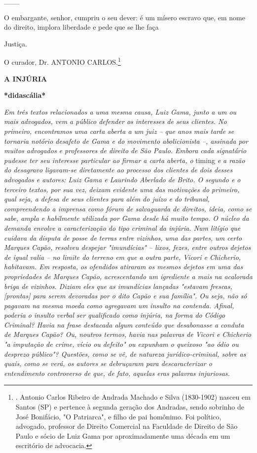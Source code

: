\_\_\_

O embargante, senhor, cumpriu o seu dever: é um mísero escravo que, em
nome do direito, implora liberdade e pede que se lhe faça

Justiça.

O curador, Dr. ANTONIO CARLOS.\footnote{. Antonio Carlos Ribeiro de
  Andrada Machado e Silva (1830-1902) nasceu em Santos (SP) e pertence à
  segunda geração dos Andradas, sendo sobrinho de José Bonifácio, "O
  Patriarca", e filho de pai homônimo. Foi político, advogado, professor
  de Direito Comercial na Faculdade de Direito de São Paulo e sócio de
  Luiz Gama por aproximadamente uma década em um escritório de
  advocacia.}

\protect\hypertarget{Secao_Sem_Titulo-6}{}{}\textbf{A INJÚRIA}

\textbf{*didascália*}

\emph{Em três textos relacionados a uma mesma causa, Luiz Gama, junto a
um ou mais advogados, vem a público defender os interesses de seus
clientes. No primeiro, encontramos uma carta aberta a um juiz -- que
anos mais tarde se tornaria notório desafeto de Gama e do movimento
abolicionista --, assinada por muitos advogados e professores de direito
de São Paulo. Embora cada signatário pudesse ter seu interesse
particular ao firmar a carta aberta, o} timing \emph{e a razão do
desagravo ligavam-se diretamente ao processo dos clientes de dois desses
advogados e autores: Luiz Gama e Laurindo Aberlado de Brito. O segundo e
o terceiro textos, por sua vez, deixam evidente uma das motivações do
primeiro, qual seja, a defesa de seus clientes para além do juízo e do
tribunal, compreendendo a imprensa como fórum de salvaguarda de
direitos, ideia, como se sabe, ampla e habilmente utilizada por Gama
desde há muito tempo. O núcleo da demanda envolve a caracterização do
tipo criminal da injúria. Num litígio que cuidava da disputa de posse de
terras entre vizinhos, uma das partes, um certo Marques Capão, resolveu
despejar "imundícias" -- lixos, fezes, entre outros dejetos de igual
valia -- no limite do terreno em que a outra parte, Vicori e Chicherio,
habitavam. Em resposta, os ofendidos atiraram os mesmos dejetos em uma
das propriedades de Marques Capão, acrescentando um igrediente a mais na
acalorada briga de vizinhos. Diziam eles que as imundícias lançadas
"estavam frescas, {[}prontas{]} para serem devoradas por o dito Capão e
sua família". Ou seja, não só pagavam na mesma moeda como agregavam um
insulto na contenda. Afinal, poderia o insulto verbal ser qualificado
como injúria, na forma do Código Criminal? Havia na frase destacada
algum conteúdo que desabonasse a conduta de Marques Capão? Ou, noutros
termos, havia nas palavras de Vicori e Chicherio "a imputação de crime,
vício ou defeito" ou expunham o queixoso "ao ódio ou desprezo público"?
Questões, como se vê, de natureza jurídico-criminal, sobre as quais,
como se verá, os autores se debruçaram para descaracterizar o
entendimento controverso de que, de fato, aquelas eras palavras
injuriosas.}

